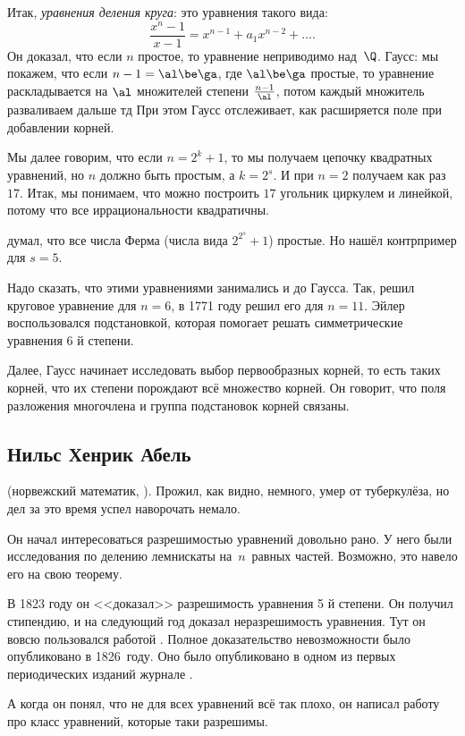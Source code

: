 \documentclass[a4paper,oneside,fleqn,10pt]{article}
\begin{document}
Итак, \emph{уравнения деления круга}: это уравнения такого вида:
$$\frac{x^n-1}{x-1} = x^{n-1} + a_1 x^{n-2} + \dots.$$
Он доказал, что если $n$ простое, то уравнение неприводимо над~$\Q$.
Гаусс: мы покажем, что если $n-1 = \al\be\ga$, где $\al\be\ga$ простые, то
уравнение раскладывается на $\al$ множителей степени $\frac{n-1}{\al}$, потом
каждый множитель разваливаем дальше тд При этом Гаусс отслеживает, как расширяется
поле при добавлении корней.

Мы далее говорим, что если $n=2^k+1$, то мы получаем цепочку квадратных уравнений,
но $n$ должно быть простым, а $k = 2^s$.
И при $n=2$ получаем как раз $17$. Итак, мы понимаем, что можно построить $17$ угольник
циркулем и линейкой, потому что все иррациональности квадратичны.

 думал, что все числа Ферма (числа вида $2^{2^s} + 1$) простые. Но  нашёл
контрпример для $s=5$.

Надо сказать, что этими уравнениями занимались и до Гаусса.
Так,  решил круговое уравнение для $n=6$, в 1771 году  решил его для $n=11$.
Эйлер воспользовался подстановкой, которая помогает решать симметрические уравнения 6 й степени.

Далее, Гаусс начинает исследовать выбор первообразных корней, то есть таких
корней, что их степени порождают всё множество корней.
Он говорит, что поля разложения многочлена и группа подстановок корней связаны.

\subsection{Нильс Хенрик Абель}

 (норвежский математик, ).
Прожил, как видно, немного, умер от туберкулёза, но дел за это время успел наворочать немало.

Он начал интересоваться разрешимостью уравнений довольно рано.
У него были исследования по делению лемнискаты на~$n$~равных частей.
Возможно, это навело его на свою теорему.

В 1823 году он <<доказал>> разрешимость уравнения 5 й степени. Он получил стипендию,
и на следующий год доказал неразрешимость уравнения. Тут он вовсю пользовался работой
. Полное доказательство невозможности было опубликовано в 1826~году.
Оно было опубликовано в одном из первых периодических изданий журнале .

А когда он понял, что не для всех уравнений всё так плохо, он написал работу про класс
уравнений, которые таки разрешимы.
\end{document}
